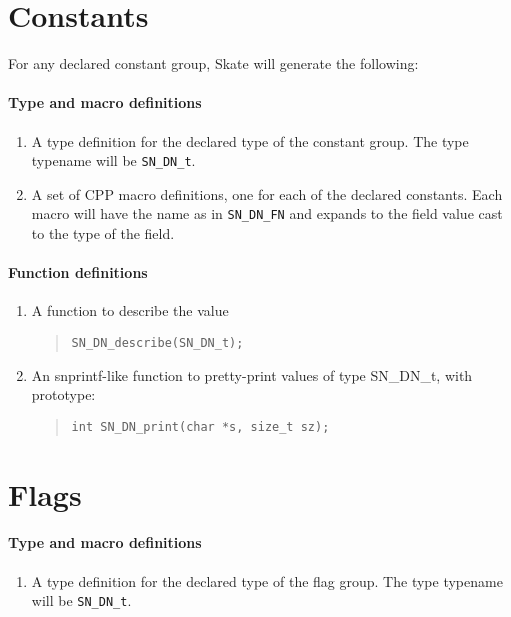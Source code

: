 \documentclass[a4paper,11pt,twoside]{report}
\begin{document}
{{\section{Constants}

For any declared constant group, Skate will generate the following:

\paragraph{Type and macro definitions}
\begin{enumerate}
  \item A type definition for the declared type of the constant group. The 
        type  typename will be \texttt{SN\_DN\_t}.
  \item A set of CPP macro definitions, one for each of the declared constants.
        Each macro will have the name as in \texttt{SN\_DN\_FN} and expands to the field value cast to the type of the field.
\end{enumerate}

\paragraph{Function definitions}
\begin{enumerate}
  \item A function to describe the value 
        \begin{quote}
          \texttt{SN\_DN\_describe(SN\_DN\_t);}
        \end{quote}

  \item An snprintf-like function to pretty-print values of type SN\_DN\_t, 
        with prototype:
        \begin{quote}
          \texttt{int SN\_DN\_print(char *s, size\_t sz);}
        \end{quote}

\end{enumerate}

\section{Flags}

\paragraph{Type and macro definitions}
\begin{enumerate}
  \item A type definition for the declared type of the flag group. The 
        type typename will be \texttt{SN\_DN\_t}.
\end{enumerate}

}}
\end{document}
